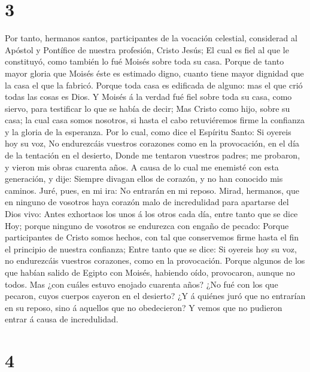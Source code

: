 \hypertarget{section-2}{%
\section{3}\label{section-2}}

 Por tanto, hermanos santos, participantes de la vocación
celestial, considerad al Apóstol y Pontífice de nuestra profesión,
Cristo Jesús;  El cual es fiel al que le constituyó, como
también lo fué Moisés sobre toda su casa.  Porque de tanto
mayor gloria que Moisés éste es estimado digno, cuanto tiene mayor
dignidad que la casa el que la fabricó.  Porque toda casa es
edificada de alguno: mas el que crió todas las cosas es Dios.
 Y Moisés á la verdad fué fiel sobre toda su casa, como
siervo, para testificar lo que se había de decir;  Mas
Cristo como hijo, sobre su casa; la cual casa somos nosotros, si hasta
el cabo retuviéremos firme la confianza y la gloria de la esperanza.
 Por lo cual, como dice el Espíritu Santo: Si oyereis hoy su
voz,  No endurezcáis vuestros corazones como en la
provocación, en el día de la tentación en el desierto, 
Donde me tentaron vuestros padres; me probaron, y vieron mis obras
cuarenta años.  A causa de lo cual me enemisté con esta
generación, y dije: Siempre divagan ellos de corazón, y no han conocido
mis caminos.  Juré, pues, en mi ira: No entrarán en mi
reposo.  Mirad, hermanos, que en ninguno de vosotros haya
corazón malo de incredulidad para apartarse del Dios vivo: 
Antes exhortaos los unos á los otros cada día, entre tanto que se dice
Hoy; porque ninguno de vosotros se endurezca con engaño de pecado:
 Porque participantes de Cristo somos hechos, con tal que
conservemos firme hasta el fin el principio de nuestra confianza;
 Entre tanto que se dice: Si oyereis hoy su voz, no
endurezcáis vuestros corazones, como en la provocación. 
Porque algunos de los que habían salido de Egipto con Moisés, habiendo
oído, provocaron, aunque no todos.  Mas ¿con cuáles estuvo
enojado cuarenta años? ¿No fué con los que pecaron, cuyos cuerpos
cayeron en el desierto?  ¿Y á quiénes juró que no entrarían
en su reposo, sino á aquellos que no obedecieron?  Y vemos
que no pudieron entrar á causa de incredulidad.

\hypertarget{section-3}{%
\section{4}\label{section-3}}

